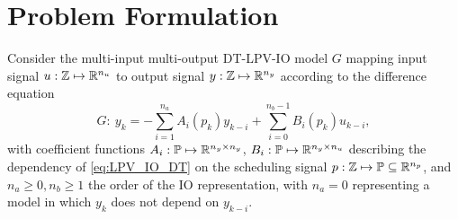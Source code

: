 \section{Problem Formulation}
\label{sec:problem_formulation}
Consider the multi-input multi-output DT-LPV-IO model $G$ mapping input signal $u: \mathbb{Z} \mapsto \mathbb{R}^{n_u}$ to output signal $y: \mathbb{Z} \mapsto \mathbb{R}^{n_y}$ according to the difference equation
\begin{equation}
    G : \ y_k = -\sum_{i=1}^{n_a} A_i(p_k) y_{k-i} + \sum_{i=0}^{n_b-1} B_i(p_k) u_{k-i},\label{eq:LPV_IO_DT}
\end{equation}
with coefficient functions $A_i: \mathbb{P} \mapsto \mathbb{R}^{n_y \times n_y}$, $B_i: \mathbb{P} \mapsto \mathbb{R}^{n_y\times n_u}$ describing the dependency of \eqref{eq:LPV_IO_DT} on the scheduling signal $p:\mathbb{Z} \mapsto \mathbb{P} \subseteq \mathbb{R}^{n_p}$, and $n_a \geq 0, n_b \geq 1$ the order of the IO representation, with $n_a=0$ representing a model in which $y_k$ does not depend on $y_{k-i}$.

